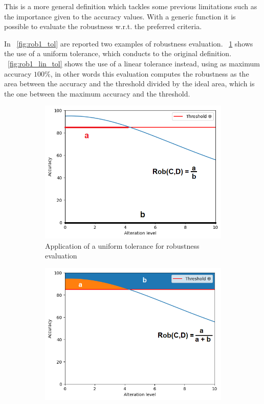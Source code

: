 This is a more general definition which tackles some previous limitations such as the importance given to the accuracy values. With a generic function it is possible to evaluate the robustness w.r.t. the preferred criteria.

In \Fig~\ref{fig:rob1_tol} are reported two examples of robustness evaluation. \Fig~\ref{fig:rob1_uni_tol} shows the use of a uniform tolerance, which conducts to the original definition. \Fig~\ref{fig:rob1_lin_tol} shows the use of a linear tolerance instead, using as maximum accuracy $100\%$, in other words this evaluation computes the robustness as the area between the accuracy and the threshold divided by the ideal area, which is the one between the maximum accuracy and the threshold.

\begin{figure}[h]
	\centering
	\begin{subfigure}{.5\textwidth}
		\centering
		\includegraphics[width=0.9\linewidth]{ImageFiles/ANNRob/rob_example}
		\caption{Application of a uniform tolerance for robustness evaluation}
		\label{fig:rob1_uni_tol}
	\end{subfigure}%
	\begin{subfigure}{.5\textwidth}
		\centering
		\includegraphics[width=0.9\linewidth]{ImageFiles/ANNRob/rob1_lin_tol}

\end{subfigure}
\end{figure}
